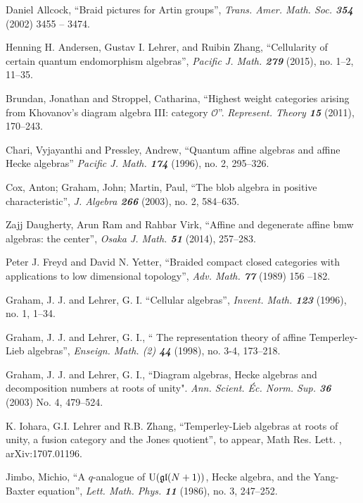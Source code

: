 \documentclass[12pt]{amsart}
\theoremstyle{definition}
\theoremstyle{remark}
\numberwithin{equation}{section}
\newcommand{\U}{{\rm{U}}}
\newcommand{\fgl}{{\mathfrak {gl}}}
\begin{document}
\begin{thebibliography}{9999}

 Daniel Allcock,   ``Braid pictures for Artin groups'',  
{\sl  Trans. Amer. Math. Soc. \bf 354} (2002) 3455 -- 3474. 

 Henning H.  Andersen,  Gustav I. Lehrer, and Ruibin Zhang,  
``Cellularity of certain quantum endomorphism algebras'', {\sl Pacific J. Math. \bf 279} (2015), no. 1--2, 11--35.

  Brundan, Jonathan and  Stroppel, Catharina,
``Highest weight categories arising from Khovanov's diagram algebra III: category $\mathcal{O}$''. 
{\sl Represent. Theory \bf 15} (2011), 170--243.

  Chari, Vyjayanthi and Pressley, Andrew, ``Quantum affine algebras and affine Hecke algebras''
{\sl  Pacific J. Math. \bf 174} (1996), no. 2, 295--326.

  Cox, Anton; Graham, John; Martin, Paul,  ``The blob algebra in positive characteristic'',
{\sl J. Algebra \bf 266} (2003), no. 2, 584--635.

 Zajj Daugherty, Arun Ram and Rahbar Virk, ``Affine and degenerate affine bmw algebras: the center'', 
{\sl Osaka J. Math. \bf 51} (2014), 257--283.

 Peter J. Freyd and David N. Yetter,  ``Braided compact closed categories 
with applications to low dimensional topology'',  {\sl Adv. Math. \bf 77} (1989)  156 --182.

 Graham, J. J. and Lehrer, G. I. ``Cellular algebras'', {\em Invent. Math. \bf 123} (1996), no. 1, 1--34.

  Graham, J. J. and Lehrer, G. I., `` The representation theory of affine Temperley-Lieb algebras'',
{\sl Enseign. Math. (2) {\bf 44}} (1998), no. 3-4, 173--218.

 Graham, J. J. and Lehrer, G. I.,  ``Diagram algebras, Hecke algebras and decomposition numbers at roots of unity". 
{\sl Ann. Scient. \'Ec. Norm. Sup. \bf 36} (2003) No.  4,   479--524.

 K. Iohara, G.I. Lehrer and R.B. Zhang, ``Temperley-Lieb algebras at roots of unity, a fusion category and the
 Jones quotient'', to appear, Math Res. Lett. , arXiv:1707.01196.


  Jimbo, Michio,  ``A $q$-analogue of $\U(\fgl(N+1))$, Hecke algebra, and the Yang-Baxter equation'',
{\sl Lett. Math. Phys. \bf 11} (1986), no. 3, 247--252. 


\end{thebibliography}
\end{document}
